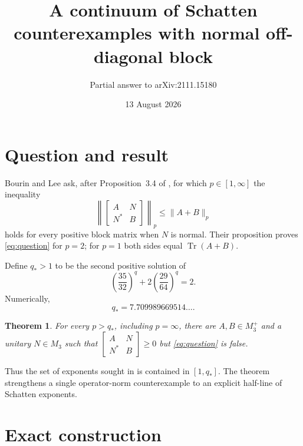 \documentclass[11pt]{article}
\title{A continuum of Schatten counterexamples with normal off-diagonal block}
\author{Partial answer to arXiv:2111.15180}
\date{13 August 2026}
\newtheorem{theorem}{Theorem}
\begin{document}
\maketitle

\begin{center}
\end{center}

\section{Question and result}

Bourin and Lee ask, after Proposition~3.4 of \cite{BL}, for which
$p\in[1,\infty]$ the inequality
\begin{equation}\label{eq:question}
 \left\|\begin{bmatrix}A&N\\N^*&B\end{bmatrix}\right\|_p
 \leq \|A+B\|_p
\end{equation}
holds for every positive block matrix when $N$ is normal.  Their proposition
proves \eqref{eq:question} for $p=2$; for $p=1$ both sides equal
$\operatorname{Tr}(A+B)$.

Define $q_*>1$ to be the second positive solution of
\begin{equation}\label{eq:qstar}
 \left(\frac{35}{32}\right)^q
 +2\left(\frac{29}{64}\right)^q=2.
\end{equation}
Numerically,
\[
 q_*=7.709989669514\ldots .
\]

\begin{theorem}\label{thm:main}
For every $p>q_*$, including $p=\infty$, there are
$A,B\in M_3^+$ and a unitary $N\in M_3$ such that
$\left[\begin{smallmatrix}A&N\\N^*&B\end{smallmatrix}\right]\geq0$ but
\eqref{eq:question} is false.
\end{theorem}

Thus the set of exponents sought in \cite{BL} is contained in
$[1,q_*]$.  The theorem strengthens a single operator-norm counterexample
to an explicit half-line of Schatten exponents.

\section{Exact construction}
\end{document}
